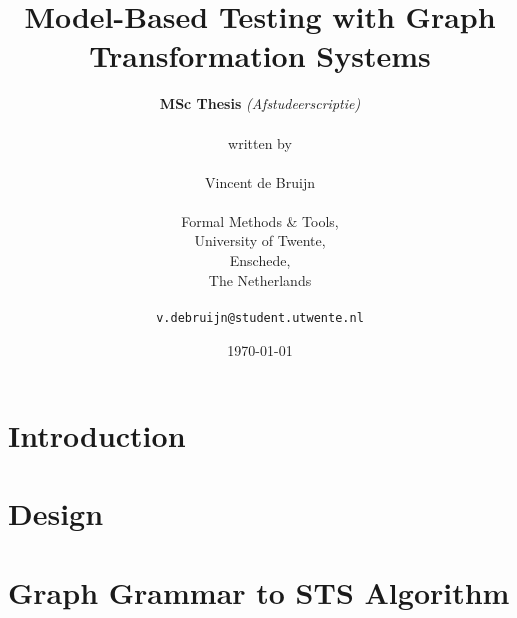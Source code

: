 \documentclass[a4paper]{report}
\theoremstyle{definition}
\begin{document}
	\title{\textbf{Model-Based Testing with Graph\\Transformation Systems}}
	\author{\textbf{MSc Thesis} \textit{(Afstudeerscriptie)}\\
	\\
	written by
	\\
	\\
	Vincent de Bruijn\\
	\\
	Formal Methods \& Tools,\\
	University of Twente,
	\\Enschede,\\
	The Netherlands\\
	\\
	\texttt{v.debruijn@student.utwente.nl}}
	\date{\today}
	\maketitle
	
	
	
	\newpage
	\tableofcontents
  \newpage
  
  \newpage
	\chapter{Introduction}
	
	\newpage
	
	
	
	
	
	
	

	
	\newpage
	\chapter{Design}\label{chapter:design}
	
	\newpage
	\begin{comment}
	
	\end{comment}
	
	\newpage
	\chapter{Graph Grammar to STS Algorithm}\label{chapter:gg_to_sts}
	\newpage
	\begin{comment}
	
	
	\end{comment}
	
	\newpage
\end{document}
